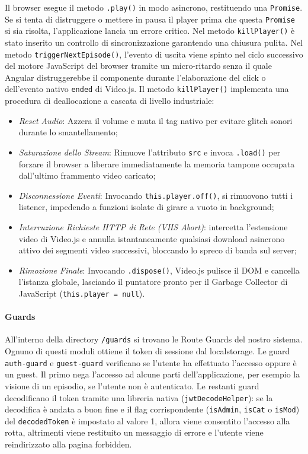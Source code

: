\documentclass[11pt,a4paper]{article}
\begin{document}
\begin{itemize}
\begin{itemize}
    \end{itemize}
    Il browser esegue il metodo \texttt{.play()} in modo asincrono, restituendo una \texttt{Promise}. Se si tenta di distruggere o mettere in pausa il player prima che questa \texttt{Promise} si sia risolta, l'applicazione lancia un errore critico. Nel metodo \texttt{killPlayer()} è stato inserito un controllo di sincronizzazione garantendo una chiusura pulita. Nel metodo \texttt{triggerNextEpisode()}, l'evento di uscita viene spinto nel ciclo successivo del motore JavaScript del browser tramite un micro-ritardo senza il quale Angular distruggerebbe il componente durante l'elaborazione del click o dell'evento nativo \texttt{ended} di Video.js. Il metodo \texttt{killPlayer()} implementa una procedura di deallocazione a cascata di livello industriale:
    \begin{itemize}
        \item \textit{Reset Audio}: Azzera il volume e muta il tag nativo per evitare glitch sonori durante lo smantellamento;
        \item \textit{Saturazione dello Stream}: Rimuove l'attributo \texttt{src} e invoca \texttt{.load()} per forzare il browser a liberare immediatamente la memoria tampone occupata dall'ultimo frammento video caricato;
        \item \textit{Disconnessione Eventi}: Invocando \texttt{this.player.off()}, si rimuovono tutti i listener, impedendo a funzioni isolate di girare a vuoto in background;
        \item \textit{Interruzione Richieste HTTP di Rete (VHS Abort)}: intercetta l'estensione video di Video.js e annulla istantaneamente qualsiasi download asincrono attivo dei segmenti video successivi, bloccando lo spreco di banda sul server;
        \item \textit{Rimozione Finale}: Invocando \texttt{.dispose()}, Video.js pulisce il DOM e cancella l'istanza globale, lasciando il puntatore pronto per il Garbage Collector di JavaScript (\texttt{this.player = null}).
    \end{itemize}
\end{itemize}

\paragraph{Guards}
All’interno della directory \texttt{/guards} si trovano le Route Guards del nostro sistema. Ognuno di questi moduli ottiene il token di sessione dal localstorage. Le guard \texttt{auth-guard} e \texttt{guest-guard} verificano se l’utente ha effettuato l’accesso oppure è un guest. Il primo nega l’accesso ad alcune parti dell’applicazione, per esempio la visione di un episodio, se l’utente non è autenticato. Le restanti guard decodificano il token tramite una libreria nativa (\texttt{jwtDecodeHelper}): se la decodifica è andata a buon fine e il flag corrispondente (\texttt{isAdmin}, \texttt{isCat} o \texttt{isMod}) del \texttt{decodedToken} è impostato al valore 1, allora viene consentito l’accesso alla rotta, altrimenti viene restituito un messaggio di errore e l’utente viene reindirizzato alla pagina forbidden.
\end{document}
